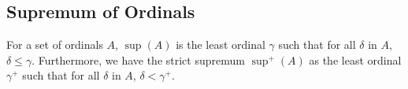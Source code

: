 \subsection{Supremum of Ordinals}

For a set of ordinals $A$, $\sup(A)$ is the least ordinal $\gamma$ 
such that for all $\delta$ in $A$, $\delta \leq \gamma$. Furthermore,
we have the strict supremum $\sup^+(A)$ as the least ordinal $\gamma^+$
such that for all $\delta$ in $A$, $\delta < \gamma^+$.
